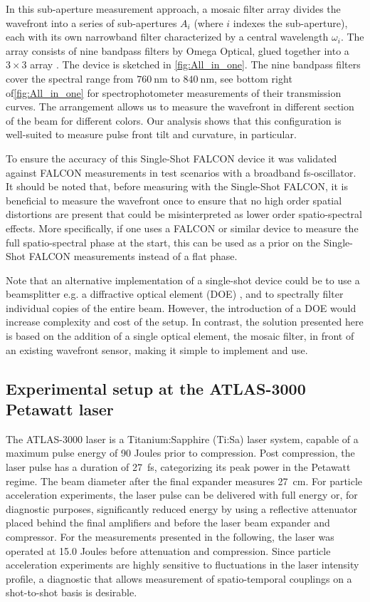 \documentclass[9pt, twocolumn,superscriptaddress]{revtex4}
\begin{document}
In this sub-aperture measurement approach, a mosaic filter array divides the wavefront into a series of sub-apertures \( A_i \) (where \( i \) indexes the sub-aperture), each with its own narrowband filter characterized by a central wavelength \( \omega_i \). The array consists of nine bandpass filters by Omega Optical, glued together into a $3\times3$ array \cite{haffa19}. The device is sketched in \cref{fig:All_in_one}. The nine bandpass filters cover the spectral range from $\SI{760}{\nano\metre}$ to $\SI{840}{\nano\metre}$, see bottom right of\cref{fig:All_in_one} for spectrophotometer measurements of their transmission curves. The arrangement allows us to measure the wavefront in different section of the beam for different colors. Our analysis shows that this configuration is well-suited to measure pulse front tilt and curvature, in particular.

To ensure the accuracy of this Single-Shot FALCON device it was validated against FALCON measurements in test scenarios with a broadband fs-oscillator. It should be noted that, before measuring with the Single-Shot FALCON, it is beneficial to measure the wavefront once to ensure that no high order spatial distortions are present that could be misinterpreted as lower order spatio-spectral effects. More specifically, if one uses a FALCON or similar device to measure the full spatio-spectral phase at the start, this can be used as a prior on the Single-Shot FALCON measurements instead of a flat phase.

Note that an alternative implementation of a single-shot device could be to use a beamsplitter e.g. a diffractive optical element (DOE) \cite{haffa19}, and to spectrally filter individual copies of the entire beam. However, the introduction of a DOE would increase complexity and cost of the setup. In contrast, the solution presented here is based on the addition of a single optical element, the mosaic filter, in front of an existing wavefront sensor, making it simple to implement and use.

\subsection{Experimental setup at the ATLAS-3000 Petawatt laser}
The ATLAS-3000 laser is a Titanium:Sapphire (Ti:Sa) laser system, capable of a maximum pulse energy of 90 Joules prior to compression. Post compression, the laser pulse has a duration of \SI{27}{\femto\second}, categorizing its peak power in the Petawatt regime. The beam diameter after the final expander measures \SI{27}{\centi\metre}.
For particle acceleration experiments, the laser pulse can be delivered with full energy or, for diagnostic purposes, significantly reduced energy by using a reflective attenuator placed behind the final amplifiers and before the laser beam expander and compressor. For the measurements presented in the following, the laser was operated at 15.0 Joules before attenuation and compression. 
Since particle acceleration experiments are highly sensitive to fluctuations in the laser intensity profile, a diagnostic that allows measurement of spatio-temporal couplings on a shot-to-shot basis is desirable. 
\end{document}
